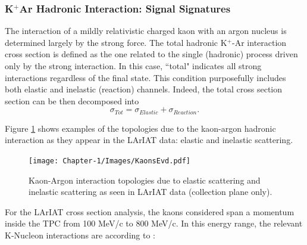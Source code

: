 

\subsubsection{K$^{+}$Ar Hadronic Interaction: Signal Signatures}\label{sec:KSignalSignature}
The interaction of a mildly relativistic charged kaon with an argon nucleus is determined largely by the strong force. The total hadronic K$^{+}$-Ar interaction cross section is defined as the one related to the single (hadronic) process driven only by the strong interaction.
In this case, ``total" indicates all strong interactions regardless of the final state. This condition purposefully includes both elastic and inelastic (reaction) channels. Indeed, the total cross section section can be then decomposed into
$$\sigma_{Tot} = \sigma_{Elastic}+ \sigma_{Reaction}.$$


Figure \ref{fig:KaonsEvd} shows examples of the topologies due to the kaon-argon hadronic interaction as they appear in the  LArIAT data: elastic and inelastic scattering.

\begin{figure}[hbpt]
\centering
\texttt{[image: Chapter-1/Images/KaonsEvd.pdf]}
\caption{Kaon-Argon interaction topologies due to elastic scattering and inelastic scattering as seen in LArIAT data (collection plane only).}
\label{fig:KaonsEvd}
\end{figure}


For the LArIAT cross section analysis, the kaons considered span a momentum inside the TPC from 100 MeV/c to 800 MeV/c. In this energy range, the relevant K-Nucleon interactions are according to \cite{fesbach1992theoretical}:

